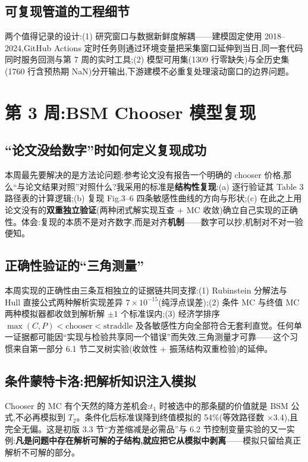 \documentclass[11pt]{ctexart}
\begin{document}
\subsection{可复现管道的工程细节}
两个值得记录的设计:(1) 研究窗口与数据新鲜度解耦——建模固定使用 2018--2024,GitHub Actions 定时任务则通过环境变量把采集窗口延伸到当日,同一套代码同时服务回测与第 7 周的实时工具;(2) 模型可用集(1309 行零缺失)与全历史集(1760 行含预热期 NaN)分开输出,下游建模不必重复处理滚动窗口的边界问题。

\section{第 3 周:BSM Chooser 模型复现}

\subsection{``论文没给数字''时如何定义复现成功}
本周最先要解决的是方法论问题:参考论文没有报告一个明确的 chooser 价格,那么``与论文结果对照''对照什么?我采用的标准是\textbf{结构性复现}:(a) 逐行验证其 Table 3 路径表的计算逻辑;(b) 复现 Fig.3--6 四条敏感性曲线的方向与形状;(c) 在此之上用论文没有的\textbf{双重独立验证}(两种闭式解实现互查 + MC 收敛)确立自己实现的正确性。体会:复现的本质不是对齐数字,而是对齐\textbf{机制}——数字可以抄,机制对不对一验便知。

\subsection{正确性验证的``三角测量''}
本周实现的正确性由三条互相独立的证据链共同支撑:(1) Rubinstein 分解法与 Hull 直接公式两种解析实现差异 $7\times10^{-15}$(纯浮点误差);(2) 条件 MC 与终值 MC 两种模拟器都收敛到解析解 $\pm1$ 个标准误内;(3) 经济学排序 $\max(C,P)<\text{chooser}<\text{straddle}$ 及各敏感性方向全部符合无套利直觉。任何单一证据都可能因``实现与检验共享同一个错误''而失效,三角测量才可靠——这个习惯来自第一部分 6.1 节二叉树实验(收敛性 + 振荡结构双重检验)的延伸。

\subsection{条件蒙特卡洛:把解析知识注入模拟}
Chooser 的 MC 有个天然的降方差机会:$t_1$ 时被选中的那条腿的价值就是 BSM 公式,不必再模拟到 $T_2$。条件化后标准误降到终值模拟的 54\%(等效路径数 $\times3.4$),且完全无偏。这是初版 3.3 节``方差缩减是必需品''与 6.2 节控制变量实验的又一实例:\textbf{凡是问题中存在解析可解的子结构,就应把它从模拟中剥离}——模拟只留给真正解析不可解的部分。
\end{document}
